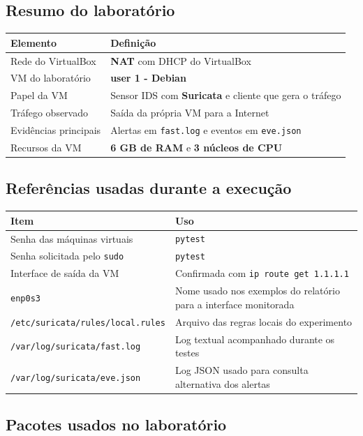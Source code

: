\subsection{Resumo do laboratório}

\begin{tabularx}{\linewidth}{lX}
\toprule
\textbf{Elemento} & \textbf{Definição} \\
\midrule
Rede do VirtualBox & \textbf{NAT} com DHCP do VirtualBox \\
VM do laboratório & \textbf{user 1 - Debian} \\
Papel da VM & Sensor IDS com \textbf{Suricata} e cliente que gera o tráfego \\
Tráfego observado & Saída da própria VM para a Internet \\
Evidências principais & Alertas em \texttt{fast.log} e eventos em \texttt{eve.json} \\
Recursos da VM & \textbf{6 GB de RAM} e \textbf{3 núcleos de CPU} \\
\bottomrule
\end{tabularx}

\subsection{Referências usadas durante a execução}

\begin{tabularx}{\linewidth}{lX}
\toprule
\textbf{Item} & \textbf{Uso} \\
\midrule
Senha das máquinas virtuais & \texttt{pytest} \\
Senha solicitada pelo \texttt{sudo} & \texttt{pytest} \\
Interface de saída da VM & Confirmada com \texttt{ip route get 1.1.1.1} \\
\texttt{enp0s3} & Nome usado nos exemplos do relatório para a interface monitorada \\
\texttt{/etc/suricata/rules/local.rules} & Arquivo das regras locais do experimento \\
\texttt{/var/log/suricata/fast.log} & Log textual acompanhado durante os testes \\
\texttt{/var/log/suricata/eve.json} & Log JSON usado para consulta alternativa dos alertas \\
\bottomrule
\end{tabularx}

\subsection{Pacotes usados no laboratório}

